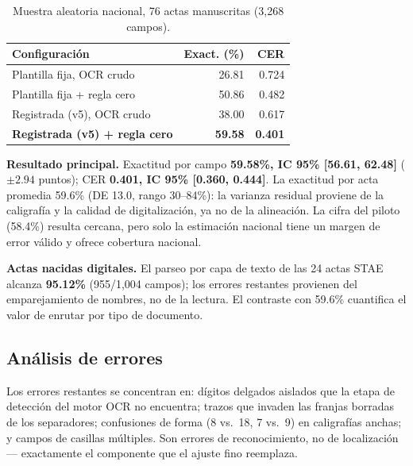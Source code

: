 \documentclass[conference]{IEEEtran}
\begin{document}
\begin{table}[t]
\caption{Muestra aleatoria nacional, 76 actas manuscritas (3,268 campos).}
\label{tab:national}
\centering
\begin{tabular}{lrr}
\toprule
Configuraci\'on & Exact. (\%) & CER \\
\midrule
Plantilla fija, OCR crudo & 26.81 & 0.724 \\
Plantilla fija + regla cero & 50.86 & 0.482 \\
Registrada (v5), OCR crudo & 38.00 & 0.617 \\
\textbf{Registrada (v5) + regla cero} & \textbf{59.58} & \textbf{0.401} \\
\bottomrule
\end{tabular}
\end{table}

\textbf{Resultado principal.} Exactitud por campo \textbf{59.58\%, IC 95\%
[56.61, 62.48]} ($\pm 2.94$ puntos); CER \textbf{0.401, IC 95\% [0.360,
0.444]}. La exactitud por acta promedia 59.6\% (DE 13.0, rango 30--84\%): la
varianza residual proviene de la caligraf\'ia y la calidad de
digitalizaci\'on, ya no de la alineaci\'on. La cifra del piloto (58.4\%)
resulta cercana, pero solo la estimaci\'on nacional tiene un margen de error
v\'alido y ofrece cobertura nacional.

\textbf{Actas nacidas digitales.} El parseo por capa de texto de las 24 actas
STAE alcanza \textbf{95.12\%} (955/1,004 campos); los errores restantes
provienen del emparejamiento de nombres, no de la lectura. El contraste con
59.6\% cuantifica el valor de enrutar por tipo de documento.

\subsection{An\'alisis de errores}
Los errores restantes se concentran en: d\'igitos delgados aislados que la
etapa de detecci\'on del motor OCR no encuentra; trazos que invaden las
franjas borradas de los separadores; confusiones de forma (8 vs.\ 18, 7 vs.\
9) en caligraf\'ias anchas; y campos de casillas m\'ultiples. Son errores de
reconocimiento, no de localizaci\'on --- exactamente el componente que el
ajuste fino reemplaza.
\end{document}
